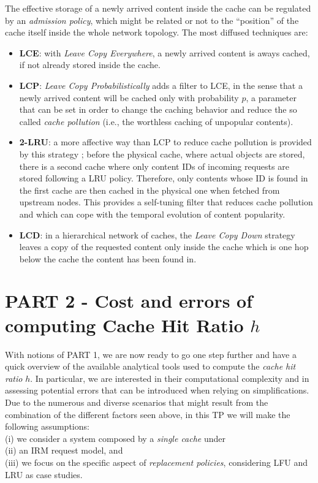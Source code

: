 \documentclass[10pt]{article}
\newcommand{\fakeacmpar}[1]{\vspace{2 mm}\noindent{\textbf{#1.}}}
\begin{document}
\fakeacmpar{Admission Policy}
The effective storage of a newly arrived content inside the cache can be regulated by an \emph{admission policy}, which might be related or not to the ``position'' of the cache itself inside the whole network topology.  
The most diffused techniques are:
\begin{itemize}
  \item \textbf{LCE}: with \emph{Leave Copy Everywhere}, a newly arrived content is aways cached, if not already stored inside the cache.
  \item \textbf{LCP}: \emph{Leave Copy Probabilistically} adds a filter to LCE, in the sense that a newly arrived content will be cached only with probability $p$, a parameter that can be set in order to change the caching behavior and reduce the so called \emph{cache pollution} (i.e., the worthless caching of unpopular contents). 
  \item \textbf{2-LRU}: a more affective way than LCP to reduce cache pollution is provided by this strategy \cite{martina14infocom}; before the physical cache, where actual objects are stored, there is a second cache where only content IDs of incoming requests are stored following a LRU policy. Therefore, only contents whose ID is found in the first cache are then cached in the physical one when fetched from upstream nodes. This provides a self-tuning filter that reduces cache pollution and which can cope with the temporal evolution of content popularity.     
  \item \textbf{LCD}: in a hierarchical network of caches, the \emph{Leave Copy Down} strategy leaves a copy of the requested content only inside the cache which is one hop below the cache the content has been found in. 
\end{itemize}

\section*{PART 2 - Cost and errors of computing Cache Hit Ratio $h$}
With notions of PART 1, we are now ready to go one step further and have a quick overview of the available analytical tools used to compute the \emph{cache hit ratio} $h$. 
In particular, we are interested in their computational complexity and in assessing potential errors that can be introduced when relying on simplifications. 
Due to the numerous and diverse scenarios that might result from the combination of the different factors seen above, in this TP we will make the following assumptions: \\ (i) we consider a system composed by a \emph{single cache} under \\ (ii) an IRM request model, and \\ (iii) we focus on the specific aspect of \emph{replacement policies}, considering LFU and LRU as case studies.  
\end{document}
